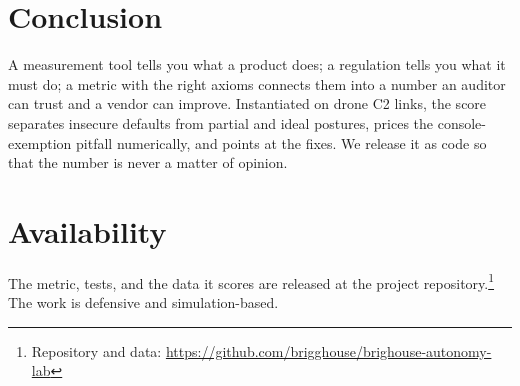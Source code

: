 \documentclass[conference]{IEEEtran}
\begin{document}
\section{Conclusion}
A measurement tool tells you what a product does; a regulation tells you what it
must do; a metric with the right axioms connects them into a number an auditor can
trust and a vendor can improve. Instantiated on drone C2 links, the score
separates insecure defaults from partial and ideal postures, prices the
console-exemption pitfall numerically, and points at the fixes. We release it as
code so that the number is never a matter of opinion.

\section*{Availability}
The metric, tests, and the data it scores are released at the project repository.\footnote{Repository and data: \url{https://github.com/brigghouse/brighouse-autonomy-lab}} The work is defensive and
simulation-based.



\end{document}
